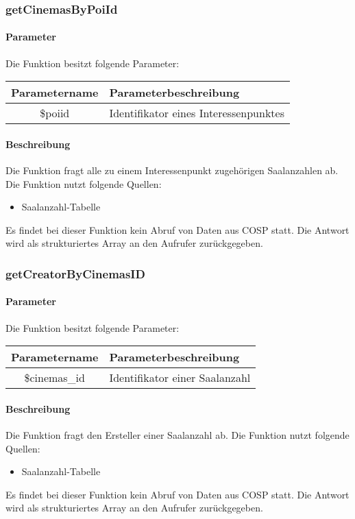 \subsubsection{getCinemasByPoiId}
\paragraph{Parameter} Die Funktion besitzt folgende Parameter:
\begin{table}[H]
	\begin{tabular}{|c|p{11cm}|}
		\hline
		\textbf{Parametername} & \textbf{Parameterbeschreibung} \\ \hline
		\$poiid       & Identifikator eines Interessenpunktes \\ \hline
	\end{tabular}
\end{table}
\paragraph{Beschreibung} Die Funktion fragt alle zu einem Interessenpunkt zugehörigen Saalanzahlen ab. Die Funktion nutzt folgende Quellen:
\begin{itemize}
	\item Saalanzahl-Tabelle
\end{itemize}
Es findet bei dieser Funktion kein Abruf von Daten aus {\glqq COSP\grqq} statt. Die Antwort wird als strukturiertes Array an den Aufrufer zurückgegeben.
\subsubsection{getCreatorByCinemasID}
\paragraph{Parameter} Die Funktion besitzt folgende Parameter:
\begin{table}[H]
	\begin{tabular}{|c|p{11cm}|}
		\hline
		\textbf{Parametername} & \textbf{Parameterbeschreibung} \\ \hline
		\$cinemas\_id       & Identifikator einer Saalanzahl \\ \hline
	\end{tabular}
\end{table}
\paragraph{Beschreibung} Die Funktion fragt den Ersteller einer Saalanzahl ab. Die Funktion nutzt folgende Quellen:
\begin{itemize}
	\item Saalanzahl-Tabelle
\end{itemize}
Es findet bei dieser Funktion kein Abruf von Daten aus {\glqq COSP\grqq} statt. Die Antwort wird als strukturiertes Array an den Aufrufer zurückgegeben.
